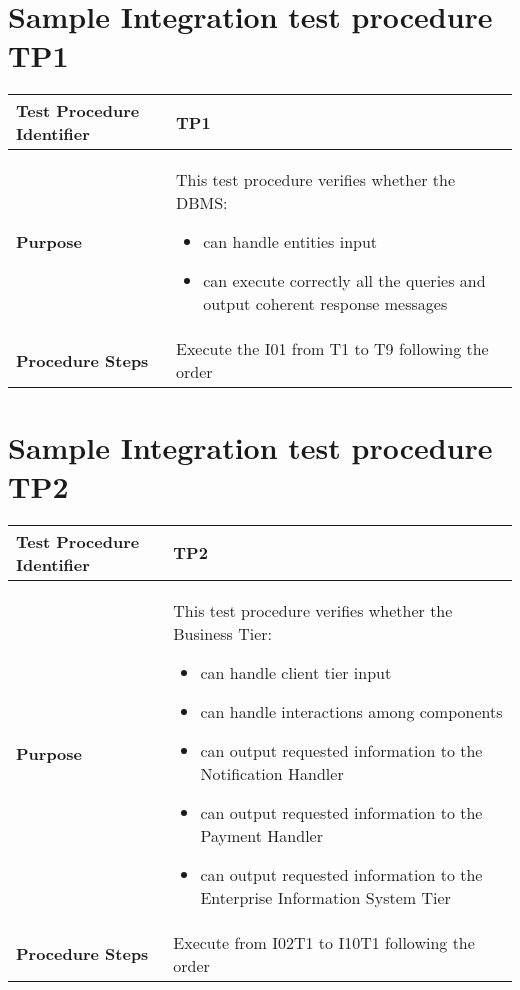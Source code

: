 \section{Sample Integration test procedure TP1} \label{TP1}
\begin{center}
	\vspace{0.6cm}
	\begin{tabular}{|l|p{9cm}|}
		\hline
		\textbf{Test Procedure Identifier} & TP1 \bigstrut \\\hline
		\textbf{Purpose} 
		& This test procedure verifies whether the DBMS: 
		\begin{itemize} 
			\item can handle entities input
			\item can execute correctly all the queries and output coherent response messages
		\end{itemize} \bigstrut \\\hline
		\textbf{Procedure Steps} & Execute the I01 from T1 to T9 following the order \bigstrut \\\hline
	\end{tabular}
\end{center}

\section{Sample Integration test procedure TP2} \label{TP2}
\begin{center}
	\vspace{0.6cm}
	\begin{tabular}{|l|p{9cm}|}
		\hline
		\textbf{Test Procedure Identifier} & TP2 \bigstrut \\\hline
		\textbf{Purpose} 
		& This test procedure verifies whether the Business Tier: 
		\begin{itemize} 
			\item can handle client tier input
			\item can handle interactions among components 
			\item can output requested information to the Notification Handler
			\item can output requested information to the Payment Handler
			\item can output requested information to the Enterprise Information System Tier
		\end{itemize} \bigstrut \\\hline
		\textbf{Procedure Steps} & Execute from I02T1 to I10T1 following the order \bigstrut \\\hline %
	\end{tabular}
\end{center}

